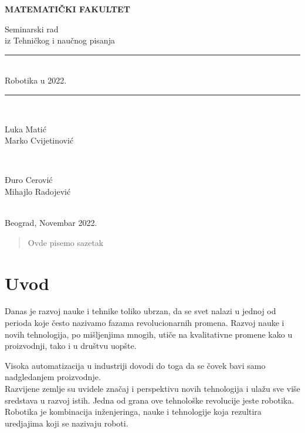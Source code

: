 \documentclass{article}
\newcommand{\HRule}{\rule{\linewidth}{0.5mm}}
\begin{document}
	\vspace*{5cm}
	\thispagestyle{empty}
	\centerline{\huge \textbf{MATEMATIČKI FAKULTET}}
	\vspace{2cm}
	
	\begin{center}
		
		{\Large Seminarski rad}\\
		{\Large	iz Tehničkog i naučnog pisanja}\\
		\Huge\HRule\\[0.4cm] %
		{Robotika u 2022.}\\
		\HRule \\[20pt] %
		\begin{minipage}{0.4\textwidth}
			\begin{flushleft} \large
				{\Large Luka Matić}\\
				{\Large Marko Cvijetinović}
			\end{flushleft}
		\end{minipage}
		~
		\begin{minipage}{0.4\textwidth}
			\begin{flushright} \large
				{\Large Đuro Cerović} \\
				{\Large Mihajlo Radojević}\\ 
			\end{flushright}
		\end{minipage}\\[5cm]
		\Large{Beograd, Novembar 2022.}
	\end{center}
	\pagebreak
 \begin{abstract}
     Ovde pisemo sazetak
 \end{abstract}
	\tableofcontents
    \pagebreak
	\section{Uvod}
	
	Danas je razvoj nauke i tehnike toliko ubrzan, da se svet nalazi u jednoj od perioda koje često nazivamo fazama revolucionarnih promena. Razvoj nauke i novih tehnologija, po mišljenjima mnogih, utiče na kvalitativne promene kako u proizvodnji, tako i u društvu uopšte.
	
	Visoka automatizacija u industriji dovodi do toga da se čovek bavi samo nadgledanjem proizvodnje.\\
	Razvijene zemlje su uvidele značaj i perspektivu novih tehnologija i ulažu sve više sredstava u razvoj istih. Jedna od grana ove tehnološke revolucije jeste robotika. Robotika je kombinacija inženjeringa, nauke i tehnologije koja rezultira uredjajima koji se nazivaju roboti. \cite{robotics2022,robots2022}
	
\end{document}
